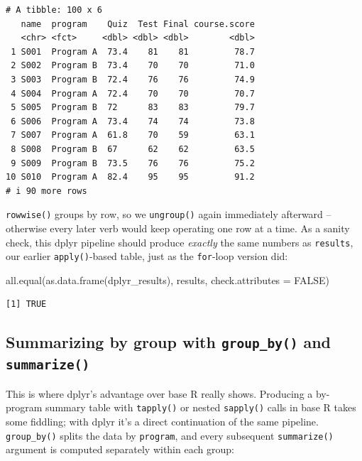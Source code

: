\documentclass[
  letterpaper,
  DIV=11,
  numbers=noendperiod]{scrreprt}
\newenvironment{Shaded}{\begin{snugshade}}{\end{snugshade}}
\newcommand{\AttributeTok}[1]{\textcolor[rgb]{0.40,0.45,0.13}{#1}}
\newcommand{\ConstantTok}[1]{\textcolor[rgb]{0.56,0.35,0.01}{#1}}
\newcommand{\FunctionTok}[1]{\textcolor[rgb]{0.28,0.35,0.67}{#1}}
\newcommand{\NormalTok}[1]{\textcolor[rgb]{0.00,0.23,0.31}{#1}}
\begin{document}
\begin{verbatim}
# A tibble: 100 x 6
   name  program    Quiz  Test Final course.score
   <chr> <fct>     <dbl> <dbl> <dbl>        <dbl>
 1 S001  Program A  73.4    81    81         78.7
 2 S002  Program B  73.4    70    70         71.0
 3 S003  Program B  72.4    76    76         74.9
 4 S004  Program A  72.4    70    70         70.7
 5 S005  Program B  72      83    83         79.7
 6 S006  Program A  73.4    74    74         73.8
 7 S007  Program A  61.8    70    59         63.1
 8 S008  Program B  67      62    62         63.5
 9 S009  Program B  73.5    76    76         75.2
10 S010  Program A  82.4    95    95         91.2
# i 90 more rows
\end{verbatim}

\texttt{rowwise()} groups by row, so we \texttt{ungroup()} again
immediately afterward -- otherwise every later verb would keep operating
one row at a time. As a sanity check, this dplyr pipeline should produce
\emph{exactly} the same numbers as \texttt{results}, our earlier
\texttt{apply()}-based table, just as the \texttt{for}-loop version did:

\begin{Shaded}
\begin{Highlighting}[]
\FunctionTok{all.equal}\NormalTok{(}\FunctionTok{as.data.frame}\NormalTok{(dplyr\_results), results, }\AttributeTok{check.attributes =} \ConstantTok{FALSE}\NormalTok{)}
\end{Highlighting}
\end{Shaded}

\begin{verbatim}
[1] TRUE
\end{verbatim}

\subsection{\texorpdfstring{Summarizing by group with
\texttt{group\_by()} and
\texttt{summarize()}}{Summarizing by group with group\_by() and summarize()}}\label{summarizing-by-group-with-group_by-and-summarize}

This is where dplyr's advantage over base R really shows. Producing a
by-program summary table with \texttt{tapply()} or nested
\texttt{sapply()} calls in base R takes some fiddling; with dplyr it's a
direct continuation of the same pipeline. \texttt{group\_by()} splits
the data by \texttt{program}, and every subsequent \texttt{summarize()}
argument is computed separately within each group:
\end{document}
